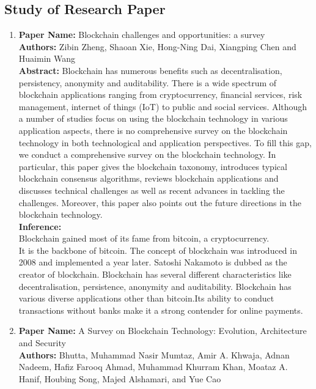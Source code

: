 \documentclass[oneside, 12pt]{book}
\begin{document}
\subsection{Study of Research Paper}
\begin{enumerate}
	\item
	      \textbf{Paper Name:} Blockchain challenges and opportunities: a survey \cite{zheng2018blockchain}\\
	      \textbf{Authors:} Zibin Zheng, Shaoan Xie, Hong-Ning Dai, Xiangping Chen and Huaimin Wang\\
	      \textbf{Abstract:} Blockchain has numerous benefits such as decentralisation, persistency, anonymity and auditability. There is a wide spectrum of blockchain applications ranging from cryptocurrency, financial services, risk management, internet of things (IoT) to public and social services. Although a number of studies focus on using the blockchain technology in various application aspects, there is no comprehensive survey on the blockchain technology in both technological and application perspectives. To fill this gap, we conduct a comprehensive survey on the blockchain technology. In particular, this paper gives the blockchain taxonomy, introduces typical blockchain consensus algorithms, reviews blockchain applications and discusses technical challenges as well as recent advances in tackling the challenges. Moreover, this paper also points out the future directions in the blockchain technology.\\
	      \textbf{Inference:}
	      \\Blockchain gained most of its fame from bitcoin, a cryptocurrency.
	      \\It is the backbone of bitcoin. The concept of blockchain was introduced in 2008 and implemented a year later. Satoshi Nakamoto is dubbed as the creator of blockchain. Blockchain has several different characteristics like decentralisation, persistence, anonymity and auditability. Blockchain has various diverse applications other than bitcoin.Its ability to conduct transactions without banks make it a strong contender for online payments.
	\item
	      \textbf{Paper Name:} A Survey on Blockchain Technology: Evolution, Architecture and Security \cite{bhutta2021survey}\\
	      \textbf{Authors:} Bhutta, Muhammad Nasir Mumtaz, Amir A. Khwaja, Adnan Nadeem, Hafiz Farooq Ahmad, Muhammad Khurram Khan, Moataz A. Hanif, Houbing Song, Majed Alshamari, and Yue Cao\\

\end{enumerate}
\end{document}
